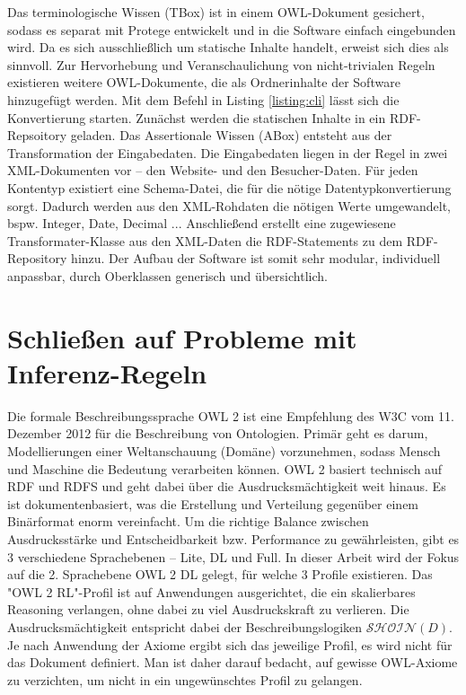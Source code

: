 \documentclass[runningheads,a4paper]{llncs}
\begin{document}
Das terminologische Wissen (TBox) ist in einem OWL-Dokument gesichert, sodass es separat mit Protege entwickelt und in die Software einfach eingebunden wird. 
Da es sich ausschließlich um statische Inhalte handelt, erweist sich dies als sinnvoll. 
Zur Hervorhebung und Veranschaulichung von nicht-trivialen Regeln existieren weitere OWL-Dokumente, die als Ordnerinhalte der Software hinzugefügt werden. 
Mit dem Befehl in Listing \ref{listing:cli} lässt sich die Konvertierung starten. 
Zunächst werden die statischen Inhalte in ein RDF-Repsoitory geladen. 
Das Assertionale Wissen (ABox) entsteht aus der Transformation der Eingabedaten. 
Die Eingabedaten liegen in der Regel in zwei XML-Dokumenten vor -- den Website- und den Besucher-Daten.
Für jeden Kontentyp existiert eine Schema-Datei, die für die nötige Datentypkonvertierung sorgt. 
Dadurch werden aus den XML-Rohdaten die nötigen Werte umgewandelt, bspw. Integer, Date, Decimal ...
Anschließend erstellt eine zugewiesene Transformater-Klasse aus den XML-Daten die RDF-Statements zu dem RDF-Repository hinzu. 
Der Aufbau der Software ist somit sehr modular, individuell anpassbar, durch Oberklassen generisch und übersichtlich.

\newpage

\section{Schließen auf Probleme mit Inferenz-Regeln}
\label{sec:reasoning}

Die formale Beschreibungssprache OWL 2 ist eine Empfehlung des W3C \cite{owl2} vom 11. Dezember 2012 für die Beschreibung von Ontologien. 
Primär geht es darum, Modellierungen einer Weltanschauung (Domäne) vorzunehmen, sodass Mensch und Maschine die Bedeutung verarbeiten können. 
OWL 2 basiert technisch auf RDF und RDFS und geht dabei über die Ausdrucksmächtigkeit weit hinaus. 
Es ist dokumentenbasiert, was die Erstellung und Verteilung gegenüber einem Binärformat enorm vereinfacht. 
Um die richtige Balance zwischen Ausdrucksstärke und Entscheidbarkeit bzw. Performance zu gewährleisten, gibt es 3 verschiedene Sprachebenen -- Lite, DL und Full. 
In dieser Arbeit wird der Fokus auf die 2. Sprachebene OWL 2 DL gelegt, für welche 3 Profile existieren. 
Das "{}OWL 2 RL"{}-Profil ist auf Anwendungen ausgerichtet, die ein skalierbares Reasoning verlangen, ohne dabei zu viel Ausdruckskraft zu verlieren. 
Die Ausdrucksmächtigkeit entspricht dabei der Beschreibungslogiken \(\mathcal{SHOIN}(D)\). 
Je nach Anwendung der Axiome ergibt sich das jeweilige Profil, es wird nicht für das Dokument definiert. 
Man ist daher darauf bedacht, auf gewisse OWL-Axiome zu verzichten, um nicht in ein ungewünschtes Profil zu gelangen.
\end{document}
